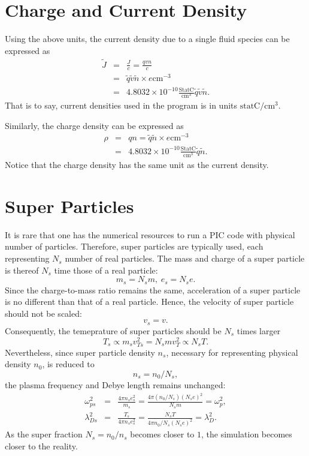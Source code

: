 \documentclass[paper=a4, fontsize=11pt]{scrartcl} %
\numberwithin{equation}{section} %
\numberwithin{figure}{section} %
\numberwithin{table}{section} %
\begin{document}
\section*{Charge and Current Density}
Using the above units, the current density due to a single fluid species can be expressed as
\begin{eqnarray}
    \tilde{J}&=&\frac{J}{c}=\frac{qvn}{c}\\
             &=&\tilde{q}\tilde{v}\tilde{n} \times e \text{cm}^{-3} \\
             &=&4.8032\times 10^{-10}\frac{\text{StatC}}{\text{cm}^{3}}
                \tilde{q}\tilde{v}\tilde{n}.
\end{eqnarray}
That is to say, current densities used in the program is in units $\text{statC}/\text{cm}^3$.

Similarly, the charge density can be expressed as
\begin{eqnarray}
    \rho&=&qn=\tilde{q}\tilde{n} \times e \text{cm}^{-3} \\
             &=&4.8032\times 10^{-10}\frac{\text{StatC}}{\text{cm}^{3}}\tilde{q}\tilde{n}.
\end{eqnarray}
Notice that the charge density has the same unit as the current density.

\section*{Super Particles}
It is rare that one has the numerical resources to run a PIC code with physical number of particles. Therefore, super particles are typically used, each representing $N_s$ number of real particles. The mass and charge of a super particle is thereof $N_s$ time those of a real particle:
\begin{equation}
    m_s=N_s m, \hspace{3pt} e_s=N_s e.
\end{equation}
Since the charge-to-mass ratio remains the same, acceleration of a super particle is no different than that of a real particle. Hence, the velocity of super particle should not be scaled:
\begin{equation}
    v_s=v.
\end{equation}
Consequently, the temeprature of super particles should be $N_s$ times larger
\begin{equation}
    T_s\propto m_s v_{Ts}^2=N_s m v_T^2\propto N_s T.
\end{equation}
Nevertheless, since super particle density $n_s$, necessary for representing physical density $n_0$, is reduced to
\begin{equation}
    n_s=n_0/N_s,
\end{equation}
the plasma frequency and Debye length remains unchanged:
\begin{eqnarray}
  \omega_{ps}^2&=&\frac{4\pi n_se_s^2}{m_s}=\frac{4\pi(n_0/N_s)(N_s e)^2}{N_s m}=\omega_p^2,\\
  \lambda_{Ds}^2&=&\frac{T_s}{4\pi n_s e_s^2}=\frac{N_s T}{4\pi n_0/N_s (N_s e)^2}=\lambda_D^2.
\end{eqnarray}
As the super fraction $N_s=n_0/n_s$ becomes closer to $1$, the simulation becomes closer to the reality.
\end{document}

